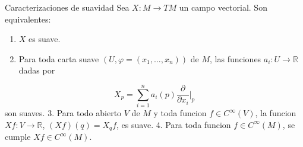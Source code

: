 \begin{bookproposition}{Caracterizaciones de suavidad}
Sea $X:M \to TM$ un campo vectorial. Son equivalentes:

\begin{enumerate}
\item $X$ es suave.
\item Para toda carta suave $(U,\varphi=(x_1,\ldots,x_n))$ de $M$, las funciones $a_i:U \to \mathbb R$ dadas por
\end{enumerate}
\[
X_p=\sum_{i=1}^n a_i(p)\frac{\partial}{\partial x_i}|_p
\]
son suaves. 3. Para todo abierto $V$ de $M$ y toda funcion $f \in C^\infty(V)$, la funcion $Xf:V \to \mathbb R$, $(Xf)(q)=X_q f$, es suave. 4. Para toda funcion $f \in C^\infty(M)$, se cumple $Xf \in C^\infty(M)$.

\end{bookproposition}
